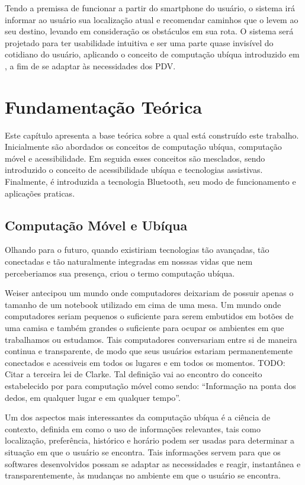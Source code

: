 \documentclass[twoside,english,brazilian]{UNISINOSartigo}
\begin{document}
Tendo a premissa de funcionar a partir do smartphone do usuário, o sistema irá informar ao usuário sua localização atual e recomendar caminhos que o levem ao seu destino, levando em consideração os obstáculos em sua rota. O sistema será projetado para ter usabilidade intuitiva e ser uma parte quase invisível do cotidiano do usuário, aplicando o conceito de computação ubíqua introduzido em , a fim de se adaptar às necessidades dos PDV.

\section{Fundamentação Teórica}
Este capítulo apresenta a base teórica sobre a qual está construído este trabalho. Inicialmente são abordados os conceitos de computação ubíqua, computação móvel e acessibilidade. Em seguida esses conceitos são mesclados, sendo introduzido o conceito de acessibilidade ubíqua e tecnologias assistivas. Finalmente, é introduzida a tecnologia Bluetooth, seu modo de funcionamento e aplicações praticas.

\subsection{Computação Móvel e Ubíqua}
Olhando para o futuro, quando existiriam tecnologias tão avançadas, tão conectadas e tão naturalmente integradas em nosssas vidas que nem perceberiamos sua presença,  criou o termo computação ubíqua. 

Weiser antecipou um mundo onde computadores deixariam de possuir apenas o tamanho de um notebook utilizado em cima de uma mesa. Um mundo onde computadores seriam pequenos o suficiente para serem embutidos em botões de uma camisa e também grandes o suficiente para ocupar os ambientes em que trabalhamos ou estudamos. Tais computadores conversariam entre si de maneira continua e transparente, de modo que seus usuários estariam permanentemente conectados e acessiveis em todos os lugares e em todos os momentos. TODO: Citar a terceira lei de Clarke. Tal definição vai ao encontro do conceito estabelecido por  para computação móvel como sendo: “Informação na ponta dos dedos, em qualquer lugar e em qualquer tempo”.

Um dos aspectos mais interessantes da computação ubíqua é a ciência de contexto, definida em  como o uso de informações relevantes, tais como localização, preferência, histórico e horário podem ser usadas para determinar a situação em que o usuário se encontra. Tais informações servem para que os softwares desenvolvidos possam se adaptar as necessidades e reagir, instantânea e transparentemente, às mudanças no ambiente em que o usuário se encontra.
\end{document}
